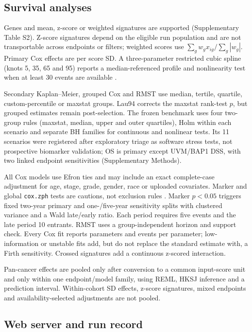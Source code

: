 \documentclass[12pt]{article}
\begin{document}
\subsection{Survival analyses}

Genes and mean, z-score or weighted signatures are supported (Supplementary
Table S2). Z-score signatures depend on the eligible run population and are not
transportable across endpoints or filters; weighted scores use
\(\sum_g w_g x_{ig}/\sum_g |w_g|\). Primary Cox effects are per score SD. A
three-parameter restricted cubic spline (knots 5, 35, 65 and 95) reports a
median-referenced profile and nonlinearity test when at least 30 events are
available \citep{harrell2015rms}.

Secondary Kaplan--Meier, grouped Cox and RMST use median, tertile, quartile,
custom-percentile or maxstat groups. Lau94 corrects the maxstat rank-test
\(p\), but grouped estimates remain post-selection. The frozen benchmark uses
four two-group rules (maxstat, median, upper and outer quartiles), Holm within
each scenario and separate BH families for continuous and nonlinear tests. Its
11 scenarios were registered after exploratory triage as software stress tests,
not prospective biomarker validation; OS is primary except UVM/BAP1 DSS, with
two linked endpoint sensitivities (Supplementary Methods).

All Cox models use Efron ties and may include an exact complete-case adjustment
for age, stage, grade, gender, race or uploaded covariates. Marker and global
\texttt{cox.zph} tests are cautions, not exclusion rules
\citep{grambschTherneau1994}. Marker \(p<0.05\) triggers fixed two-year primary
and one-/five-year sensitivity splits with clustered variance and a Wald
late/early ratio. Each period requires five events and the late period 10
entrants. RMST uses a group-independent horizon and support check. Every Cox
fit reports parameters and events per parameter; low-information or unstable
fits add, but do not replace the standard estimate with, a Firth sensitivity.
Crossed signatures add a continuous z-scored interaction.

Pan-cancer effects are pooled only after conversion to a common input-score
unit and only within one endpoint/model family, using REML, HKSJ inference and
a prediction interval. Within-cohort SD effects, z-score signatures, mixed
endpoints and availability-selected adjustments are not pooled.

\subsection{Web server and run record}
\end{document}
